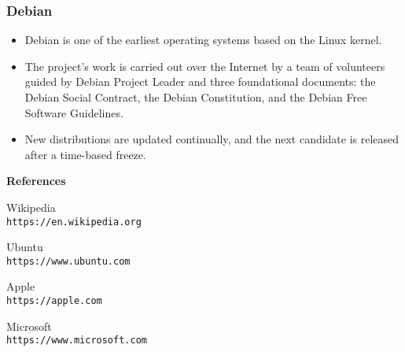 \documentclass[10pt,    %
    english,            %
    xcolor=table,       %
    envcountsect        %
]{beamer}
\begin{document}
\begin{frame}
    \label{frm:second}
    \frametitle{Debian} 
    
    \begin{itemize}
        \item Debian is one of the earliest operating systems based on the Linux kernel. 
        \item The project's work is carried out over the Internet by a team of volunteers guided by Debian Project Leader and three foundational documents: the Debian Social Contract, the Debian Constitution, and the Debian Free Software Guidelines.
        \item New distributions are updated continually, and the next candidate is released after a time-based freeze.
    \end{itemize}
\end{frame}

\begin{frame}{\textbf{References}}
  

\begin{thebibliography}{9}
Wikipedia \\
\texttt{https://en.wikipedia.org}

Ubuntu \\
\texttt{https://www.ubuntu.com}

Apple \\
\texttt{https://apple.com}

Microsoft \\
\texttt{https://www.microsoft.com}


 
\end{thebibliography}
  \end{frame}


\end{document}
